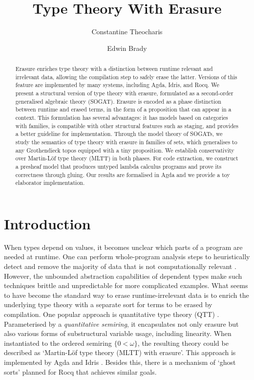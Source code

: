 \documentclass[a4paper,UKenglish,cleveref,autoref,thm-restate]{lipics-v2021}
\title{Type Theory With Erasure}
\author{Constantine Theocharis}{University of St Andrews}{kt81@st-andrews.ac.uk}{https://orcid.org/0000-0002-9734-367X}{}
\author{Edwin Brady}{University of St Andrews}{ecb10@st-andrews.ac.uk}{https://orcid.org/0009-0001-0198-2750}{}
\begin{document}
\maketitle

\begin{abstract}
Erasure enriches type theory with a distinction between runtime relevant and
irrelevant data, allowing the compilation step to safely erase the latter.
Versions of this feature are implemented by many systems, including Agda, Idris,
and Rocq. We present a structural version of type theory with erasure,
formulated as a second-order generalised algebraic theory (SOGAT). Erasure is
encoded as a phase distinction between runtime and erased terms, in the form of
a proposition that can appear in a context. This formulation has several
advantages: it has models based on categories with families, is compatible with
other structural features such as staging, and provides a better guideline for
implementation. Through the model theory of SOGATs, we study the semantics of
type theory with erasure in families of sets, which generalises to any Grothendieck
topos equipped with a tiny proposition. We establish conservativity over
Martin-L\"of type theory (MLTT) in both phases. For code extraction, we construct a
presheaf model that produces untyped lambda calculus programs and prove its
correctness through gluing. Our results are formalised in Agda and we provide a
toy elaborator implementation.
\end{abstract}

\section{Introduction}\label{sec:intro}

When types depend on values, it becomes unclear which parts of a program are
needed at runtime. One can perform whole-program analysis steps to heuristically
detect and remove the majority of data that is not computationally relevant
\cite{Brady2004-ay,Tejiscak2020-rg}. However, the unbounded abstraction
capabilities of dependent types make such techniques brittle and unpredictable
for more complicated examples. What seems to have become the standard way to
erase runtime-irrelevant data is to enrich the underlying type theory with a
separate sort for terms to be erased by compilation. One popular approach
is quantitative type theory (QTT) \cite{McBride2016-oa,Atkey2018-pj}. Parameterised by a
\emph{quantitative semiring}, it encapsulates not only erasure but also
various forms of substructural variable usage, including linearity. When
instantiated to the ordered semiring $\{0 < \omega\}$, the resulting theory
could be described as `Martin-L\"of type theory (MLTT) with erasure'. This approach is
implemented by Agda \cite{agda-irrelevance} and Idris \cite{idris-quantities}.
Besides this, there is a mechanism of `ghost sorts' \cite{Winterhalter2024-pw}
planned for Rocq \cite{Winterhalter2025-tt} that achieves
similar goals.
\end{document}
